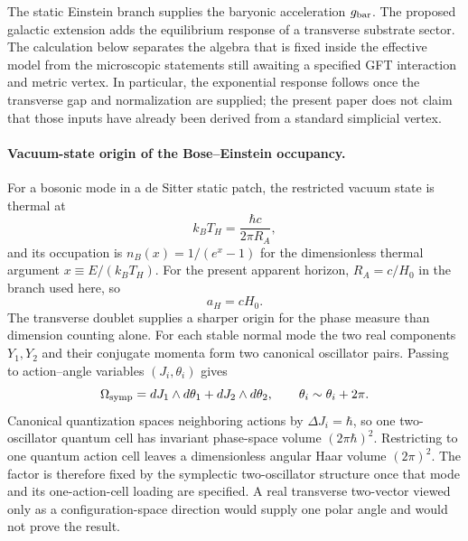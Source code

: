 \documentclass[11pt]{article}
\begin{document}
The static Einstein branch supplies the baryonic acceleration $g_{\rm bar}$. The proposed galactic extension adds the equilibrium response of a transverse substrate sector. The calculation below separates the algebra that is fixed inside the effective model from the microscopic statements still awaiting a specified GFT interaction and metric vertex. In particular, the exponential response follows once the transverse gap and normalization are supplied; the present paper does not claim that those inputs have already been derived from a standard simplicial vertex.

\paragraph{Vacuum-state origin of the Bose--Einstein occupancy.}
For a bosonic mode in a de Sitter static patch, the restricted vacuum state is thermal at
\[
k_B T_H=\frac{\hbar c}{2\pi R_A},
\]
and its occupation is $n_B(x)=1/(e^x-1)$ for the dimensionless thermal argument $x\equiv E/(k_BT_H)$.
For the present apparent horizon, $R_A=c/H_0$ in the branch used here, so
\[
a_H=cH_0.
\]
The transverse doublet supplies a sharper origin for the phase measure than dimension counting alone. For each stable normal mode the two real components $Y_1,Y_2$ and their conjugate momenta form two canonical oscillator pairs. Passing to action--angle variables $(J_i,\theta_i)$ gives
\[
\Omega_{\rm symp}=dJ_1\wedge d\theta_1+dJ_2\wedge d\theta_2,
\qquad
\theta_i\sim\theta_i+2\pi .
\]
Canonical quantization spaces neighboring actions by $\Delta J_i=\hbar$, so one two-oscillator quantum cell has invariant phase-space volume $(2\pi\hbar)^2$. Restricting to one quantum action cell leaves a dimensionless angular Haar volume $(2\pi)^2$. The factor is therefore fixed by the symplectic two-oscillator structure once that mode and its one-action-cell loading are specified. A real transverse two-vector viewed only as a configuration-space direction would supply one polar angle and would not prove the result.
\end{document}
